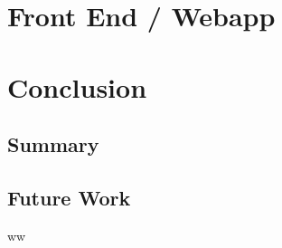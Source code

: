 \documentclass[11pt]{article}
\begin{document}
    \section{Front End / Webapp}

\section{Conclusion}
    \subsection{Summary}
    \subsection{Future Work}
    ww

%

\end{document}
